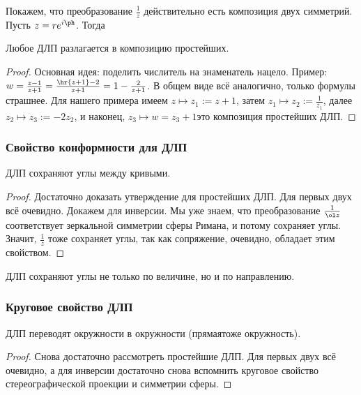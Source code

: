 \documentclass[a4paper]{article}
\begin{document}
Покажем, что преобразование $\frac{1}{z}$ действительно есть композиция двух симметрий. Пусть $z = re^{i\ph}$. Тогда

\begin{theorem}
Любое ДЛП разлагается в композицию простейших.
\end{theorem}
\begin{proof}
Основная идея: поделить числитель на знаменатель нацело.
Пример: $w = \frac{z - 1}{z + 1} = \frac{\hr{z + 1} - 2}{z + 1} = 1 - \frac{2}{z + 1}$.
В общем виде всё аналогично, только формулы страшнее. Для нашего примера имеем
$z \mapsto z_1 := z + 1$, затем $z_1 \mapsto z_2 := \frac{1}{z_1}$, далее
$z_2 \mapsto z_3 := - 2z_2$, и наконец, $z_3 \mapsto w = z_3 + 1$\т это
композиция простейших ДЛП.
\end{proof}

\subsubsection{Свойство конформности для ДЛП}

\begin{theorem}
ДЛП сохраняют углы между кривыми.
\end{theorem}
\begin{proof}
Достаточно доказать утверждение для простейших ДЛП. Для первых двух всё очевидно. Докажем для
инверсии. Мы уже знаем, что преобразование $\frac{1}{\ol z}$ соответствует зеркальной симметрии сферы  Римана, и потому сохраняет углы.
Значит, $\frac{1}{z}$ тоже сохраняет углы, так как сопряжение, очевидно, обладает этим свойством.
\end{proof}

\begin{note}
ДЛП сохраняют углы не только по величине, но и по направлению.
\end{note}

\subsubsection{Круговое свойство ДЛП}

\begin{theorem}
ДЛП переводят окружности в окружности (прямая\т тоже окружность).
\end{theorem}
\begin{proof}
Снова достаточно рассмотреть простейшие ДЛП. Для первых двух всё очевидно, а для инверсии достаточно снова вспомнить
круговое свойство стереографической проекции и симметрии сферы.
\end{proof}
\end{document}
